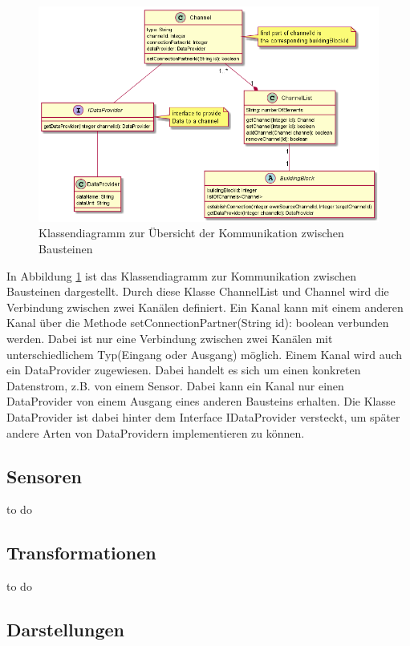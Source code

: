 \documentclass[parskip=full]{scrartcl}
\begin{document}
\begin{figure}[htbp]
	\begin{center}
		\includegraphics[width = 16cm]{Grafik/BuildingBlock.png}
		\caption{Klassendiagramm zur Übersicht der Kommunikation zwischen Bausteinen }
		\label{class-BuildingBlock}
	\end{center}
\end{figure}
In Abbildung \ref{class-BuildingBlock} ist das Klassendiagramm zur Kommunikation zwischen Bausteinen dargestellt. Durch diese Klasse ChannelList und Channel wird die Verbindung zwischen zwei Kanälen definiert. Ein Kanal kann mit einem anderen Kanal über die Methode setConnectionPartner(String id): boolean verbunden werden. Dabei ist nur eine Verbindung zwischen zwei Kanälen mit unterschiedlichem Typ(Eingang oder Ausgang) möglich. Einem Kanal wird auch ein DataProvider zugewiesen. Dabei handelt es sich um einen konkreten Datenstrom, z.B. von einem Sensor. Dabei kann ein Kanal nur einen DataProvider von einem Ausgang eines anderen Bausteins erhalten.
Die Klasse DataProvider ist dabei hinter dem Interface IDataProvider versteckt, um später andere Arten von DataProvidern implementieren zu können.

\subsection{Sensoren}
to do
\subsection{Transformationen}
to do
\subsection{Darstellungen}
\end{document}
